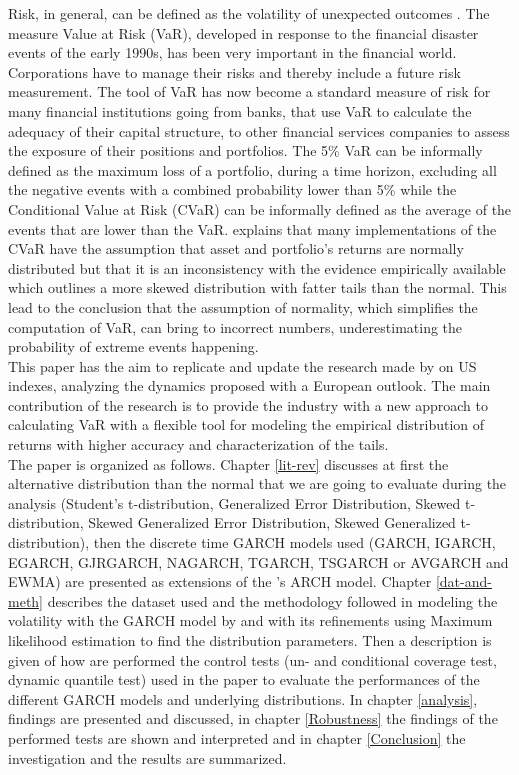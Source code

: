 \documentclass[a4paper, twoside]{templates/ociamthesis}
\begin{document}
\noindent Risk, in general, can be defined as the volatility of unexpected outcomes \autocite{jorion2007}. The measure Value at Risk (VaR), developed in response to the financial disaster events of the early 1990s, has been very important in the financial world. Corporations have to manage their risks and thereby include a future risk measurement. The tool of VaR has now become a standard measure of risk for many financial institutions going from banks, that use VaR to calculate the adequacy of their capital structure, to other financial services companies to assess the exposure of their positions and portfolios. The 5\% VaR can be informally defined as the maximum loss of a portfolio, during a time horizon, excluding all the negative events with a combined probability lower than 5\% while the Conditional Value at Risk (CVaR) can be informally defined as the average of the events that are lower than the VaR. \textcite{bali2008} explains that many implementations of the CVaR have the assumption that asset and portfolio's returns are normally distributed but that it is an inconsistency with the evidence empirically available which outlines a more skewed distribution with fatter tails than the normal. This lead to the conclusion that the assumption of normality, which simplifies the computation of VaR, can bring to incorrect numbers, underestimating the probability of extreme events happening.~\\

\noindent This paper has the aim to replicate and update the research made by \textcite{bali2008} on US indexes, analyzing the dynamics proposed with a European outlook. The main contribution of the research is to provide the industry with a new approach to calculating VaR with a flexible tool for modeling the empirical distribution of returns with higher accuracy and characterization of the tails.~\\

\noindent The paper is organized as follows. Chapter \ref{lit-rev} discusses at first the alternative distribution than the normal that we are going to evaluate during the analysis (Student's t-distribution, Generalized Error Distribution, Skewed t-distribution, Skewed Generalized Error Distribution, Skewed Generalized t-distribution), then the discrete time GARCH models used (GARCH, IGARCH, EGARCH, GJRGARCH, NAGARCH, TGARCH, TSGARCH or AVGARCH and EWMA) are presented as extensions of the \textcite{engle1982} 's ARCH model. Chapter \ref{dat-and-meth} describes the dataset used and the methodology followed in modeling the volatility with the GARCH model by \textcite{bollerslev1986} and with its refinements using Maximum likelihood estimation to find the distribution parameters. Then a description is given of how are performed the control tests (un- and conditional coverage test, dynamic quantile test) used in the paper to evaluate the performances of the different GARCH models and underlying distributions. In chapter \ref{analysis}, findings are presented and discussed, in chapter \ref{Robustness} the findings of the performed tests are shown and interpreted and in chapter \ref{Conclusion} the investigation and the results are summarized.
\end{document}
